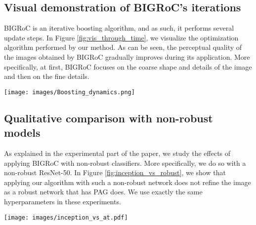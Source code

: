 \documentclass[10pt]{article} \usepackage[accepted]{tmlr}
\begin{document}
\subsection{Visual demonstration of BIGRoC's iterations}
BIGRoC is an iterative boosting algorithm, and as such, it performs several update steps. In Figure \ref{fig:vis_through_time}, we visualize the optimization algorithm performed by our method. As can be seen, the perceptual quality of the images obtained by BIGRoC gradually improves during its application. More specifically, at first, BIGRoC focuses on the coarse shape and details of the image and then on the fine details.

\begin{figure*}[ht]
    \centering
    \texttt{[image: images/Boosting\_dynamics.png]}
    \caption{\textbf{BIGRoC's steps visualization}, demonstrated using VAE trained on CIFAR-10: On the left column we show the generated images of the model. The righmost column corresponds with the final output of BIGRoC. The middle 9 columns are the results obtained after each intermediate step of our algorithm.}
    \label{fig:vis_through_time}
\end{figure*}

\subsection{Qualitative comparison with non-robust models}
As explained in the experimental part of the paper, we study the effects of applying BIGRoC with non-robust classifiers.
More specifically, we do so with a non-robust ResNet-50.
In Figure \ref{fig:inception_vs_robust}, we show that applying our algorithm with such a non-robust network does not refine the image as a robust network that has PAG does.
We use exactly the same hyperparameters in these experiments.

\begin{figure*}[ht]
    \centering
    \texttt{[image: images/inception\_vs\_at.pdf]}
    \caption{\textbf{Guiding classifier effect}. Qualitative comparison between the refinement obtained by BIGRoC with robust and non-robust models guidance.}
    \label{fig:inception_vs_robust}
\end{figure*}
\end{document}
